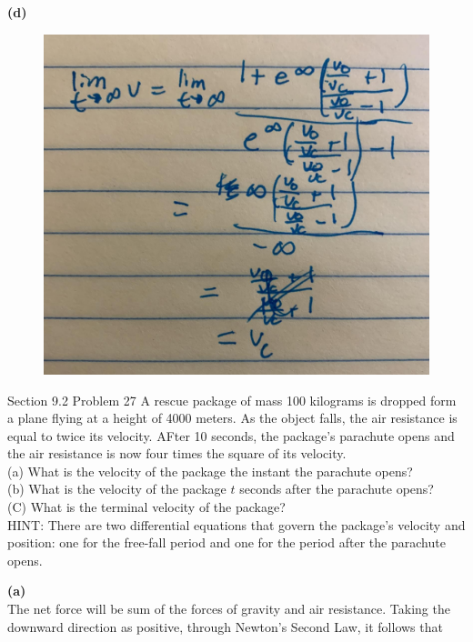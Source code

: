 \documentclass{article}
\begin{document}
    \textbf{(d)}
    \begin{figure}[hbt!]
        \centering
        \includegraphics[scale=0.1]{parachutist2}
    \end{figure}
    




    \begin{tbhtheorem}{Section 9.2 Problem 27}
        A rescue package of mass 100 kilograms is dropped form a plane flying at a height of 4000 meters. As the object falls, the air resistance is equal to twice its velocity. AFter 10 seconds, the package's
        parachute opens and the air resistance is now four times the square of its velocity. \\
        (a) What is the velocity of the package the instant the parachute opens? \\
        (b) What is the velocity of the package $t$ seconds after the parachute opens? \\
        (C) What is the terminal velocity of the package? \\

        HINT: There are two differential equations that govern the package's velocity and position: one for the free-fall period and one for the period after the parachute opens.
    \end{tbhtheorem}

    \textbf{(a)} \\
    The net force will be sum of the forces of gravity and air resistance. Taking the downward direction as positive, through Newton's Second Law, it follows that
\end{document}
